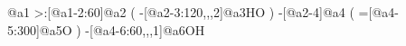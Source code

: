                      @{a1}%
       >:[@{a1-2}:60]@{a2}%
                        (
       -[@{a2-3}:120,,,2]@{a3}HO%
                        )
           -[@{a2-4}]@{a4}%
                        (
           =[@{a4-5}:300]@{a5}O%
                        )
    -[@{a4-6}:60,,,1]@{a6}OH%